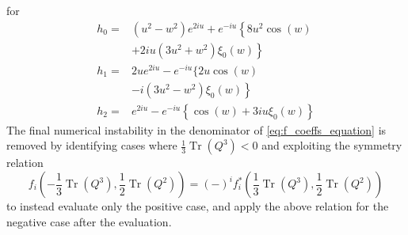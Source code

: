 \documentclass[a4paper,10pt]{article}
\begin{document}
for 
\begin{equation}
\begin{aligned}
h_{0}=&\left(u^{2}-w^{2}\right) e^{2 i u}+e^{-i u}\left\{8 u^{2} \cos (w)\right.\\
&\left.+2 i u\left(3 u^{2}+w^{2}\right) \xi_{0}(w)\right\} \\
h_{1}=& 2 u e^{2 i u}-e^{-i u}\{2 u \cos (w)\\
&\left.-i\left(3 u^{2}-w^{2}\right) \xi_{0}(w)\right\} \\
h_{2}=& e^{2 i u}-e^{-i u}\left\{\cos (w)+3 i u \xi_{0}(w)\right\}
\end{aligned}
\end{equation}
The final numerical instability in the denominator of \eqref{eq:f_coeffs_equation} is removed by identifying cases where $\frac{1}{3} \operatorname{Tr}\left(Q^{3}\right)<0$ and exploiting the symmetry relation 
$$
f_{i}\left(-\frac{1}{3} \operatorname{Tr}\left(Q^{3}\right), \frac{1}{2} \operatorname{Tr}\left(Q^{2}\right)\right)=(-)^{i} f_{i}^{*}\left(\frac{1}{3} \operatorname{Tr}\left(Q^{3}\right), \frac{1}{2} \operatorname{Tr}\left(Q^{2}\right)\right)
$$
to instead evaluate only the positive case, and apply the above relation for the negative case after the evaluation.
\end{document}
